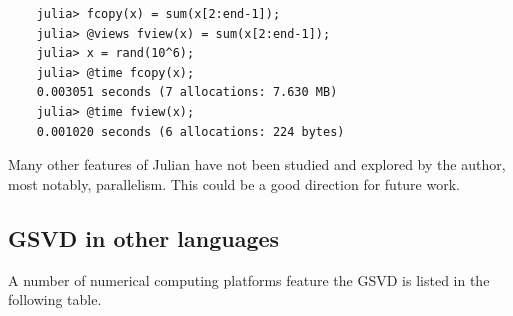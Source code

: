 \begin{itemize}
\begin{verbatim}
	julia> fcopy(x) = sum(x[2:end-1]);
	julia> @views fview(x) = sum(x[2:end-1]);
	julia> x = rand(10^6);
	julia> @time fcopy(x);
  	0.003051 seconds (7 allocations: 7.630 MB)
	julia> @time fview(x);
  	0.001020 seconds (6 allocations: 224 bytes)
\end{verbatim}

\end{itemize} 

Many other features of Julian have not been studied and explored 
by the author, most notably, parallelism. This could be 
a good direction for future work. 


\subsection{GSVD in other languages}  
A number of numerical computing platforms feature 
the GSVD is listed in the following table. 
    

